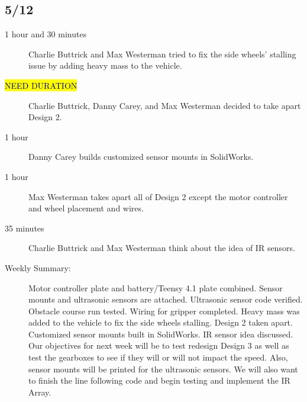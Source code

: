 \documentclass[11pt]{report}
\begin{document}
\begin{adjustwidth}{0.5cm}{0cm}
\vspace{-2.1em}\subsection*{5/12}
\begin{greylineformat}
\begin{description}
    \item [1 hour and 30 minutes] Charlie Buttrick and Max Westerman tried to fix the side wheels' stalling issue by adding heavy mass to the vehicle. 
    \item [\hl{NEED DURATION}] Charlie Buttrick, Danny Carey, and Max Westerman decided to take apart Design 2.
    \item [1 hour] Danny Carey builds customized sensor mounts in SolidWorks. 
    \item [1 hour] Max Westerman takes apart all of Design 2 except the motor controller and wheel placement and wires. 
    \item [35 minutes] Charlie Buttrick and Max Westerman think about the idea of IR sensors. 
\end{description}\end{greylineformat}

\newpage
\begin{description}
    \item [Weekly Summary:]Motor controller plate and battery/Teensy 4.1 plate combined. Sensor mounts and ultrasonic sensors are attached. Ultrasonic sensor code verified. Obstacle course run tested. Wiring for gripper completed. Heavy mass was added to the vehicle to fix the side wheels stalling. Design 2 taken apart. Customized sensor mounts built in SolidWorks. \gls{IR} sensor idea discussed. Our objectives for next week will be to test redesign Design 3 as well as test the gearboxes to see if they will or will not impact the speed. Also, sensor mounts will be printed for the ultrasonic sensors. We will also want to finish the line following code and begin testing and implement the \gls{IR} Array.
\end{description}\vspace{0.5em}
\end{adjustwidth}
\end{document}
